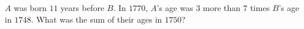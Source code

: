 $A$ was born $11$ years before $B$. In $1770$, $A$'s age was $3$ more than $7$ times $B$'s age in $1748$. What was the sum of their ages in $1750$?
